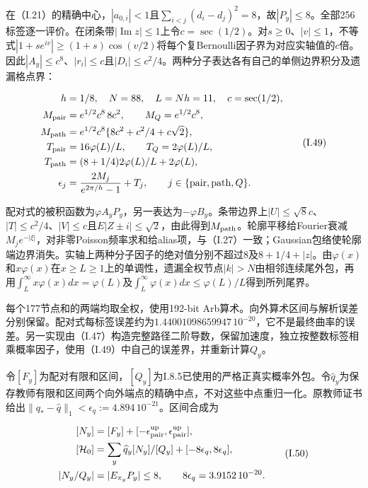 \documentclass[11pt,a4paper]{article}
\begin{document}
在（I.21）的精确中心，\(|a_{0,i}|<1\)且\(\sum_{i<j}(d_i-d_j)^2=8\)，故\(|P_y|\le8\)。全部256标签逐一评价。在闭条带\(|\operatorname{Im}z|\le1\)上令\(c=\sec(1/2)\)。对\(s\ge0\)、\(|v|\le1\)，不等式\(|1+s e^{iv}|\ge(1+s)\cos(v/2)\)将每个复Bernoulli因子界为对应实轴值的\(c\)倍。因此\(|A_y|\le c^8\)、\(|r_i|\le c\)且\(|D_i|\le c^2/4\)。两种分子表达各有自己的单侧边界积分及遗漏格点界：

\[
\begin{aligned}
h&=1/8,\quad N=88,\quad L=Nh=11,\quad c=\sec(1/2),\\
M_{\rm pair}&=e^{1/2}c^8\,8c^2,\qquad M_Q=e^{1/2}c^8,\\
M_{\rm path}&=e^{1/2}c^8\{8c^2+c^2/4+c\sqrt2\},\\
T_{\rm pair}&=16\varphi(L)/L,\qquad T_Q=2\varphi(L)/L,\\
T_{\rm path}&=(8+1/4)2\varphi(L)/L+2\varphi(L),\\
\epsilon_j&=\frac{2M_j}{e^{2\pi/h}-1}+T_j,\qquad j\in\{{\rm pair},{\rm path},Q\}.
\end{aligned}
\tag{I.49}
\]

配对式的被积函数为\(\varphi A_yP_y\)，另一表达为\(-\varphi B_y\)。条带边界上\(|U|\le\sqrt8c\)、\(|T|\le c^2/4\)、\(|V|\le c\)且\(E|Z\pm i|\le\sqrt2\)，由此得到\(M_{\rm path}\)。轮廓平移给Fourier衰减\(M_j e^{-|\xi|}\)，对非零Poisson频率求和给alias项，与（I.27）一致；Gaussian包络使轮廓端边界消失。实轴上两种分子因子的绝对值分别不超过\(8\)及\(8+1/4+|z|\)。由\(\varphi(x)\)和\(x\varphi(x)\)在\(x\ge L\ge1\)上的单调性，遗漏全权节点\(|k|>N\)由相邻连续尾外包，再用\(\int_L^\infty x\varphi(x)dx=\varphi(L)\)及\(\int_L^\infty\varphi(x)dx\le\varphi(L)/L\)得到所列尾界。

每个177节点和的两端均取全权，使用192-bit
Arb算术。向外算术区间与解析误差分别保留。配对式每标签误差约为\(1.44001098659947\,10^{-20}\)，它不是最终曲率的误差。另一实现由（I.47）构造完整路径二阶导数，保留加速度，独立按整数标签相乘概率因子，使用（I.49）中自己的误差界，并重新计算\(Q_y\)。

令\([F_y]\)为配对有限和区间，\([Q_y]\)为I.8.5已使用的严格正真实概率外包。令\(\widehat q_y\)为保存教师有限和区间两个向外端点的精确中点，不对这些中点重归一化。原教师证书给出\(\|q_*-\widehat q\|_1<\epsilon_q:=4.894\,10^{-21}\)。区间合成为

\[
\begin{aligned}
[N_y]&=[F_y]+[-\epsilon_{\rm pair}^{\rm up},\epsilon_{\rm pair}^{\rm up}],\\
[\mathcal H_0]&=\sum_y\widehat q_y[N_y]/[Q_y]+[-8\epsilon_q,8\epsilon_q],\\
|N_y/Q_y|&=|E_{\pi_y}P_y|\le8,\qquad
8\epsilon_q=3.9152\,10^{-20}.
\end{aligned}
\tag{I.50}
\]
\end{document}

